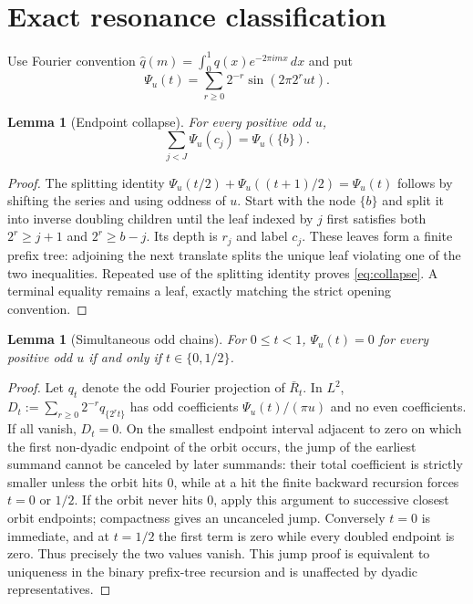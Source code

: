 \documentclass[11pt]{article}
\numberwithin{equation}{section}
\newtheorem{lemma}[theorem]{Lemma}
\theoremstyle{definition}\newtheorem{definition}[theorem]{Definition}
\theoremstyle{remark}\newtheorem{remark}[theorem]{Remark}
\newcommand{\1}{\mathbf 1}\newcommand{\cD}{\mathcal D}
\begin{document}
\clearpage
\section{Exact resonance classification}\label{sec:zeros}
Use Fourier convention $\widehat q(m)=\int_0^1q(x)e^{-2\pi imx}\,dx$ and put
\begin{equation}\Psi_u(t)=\sum_{r\ge0}2^{-r}\sin(2\pi2^ru t). \label{eq:Psi}
\end{equation}

\begin{lemma}[Endpoint collapse]\label{lem:collapse}
For every positive odd $u$,
\begin{equation}\sum_{j<J}\Psi_u(c_j)=\Psi_u(\{b\}).            \label{eq:collapse}
\end{equation}
\end{lemma}
\begin{proof}
The splitting identity
$\Psi_u(t/2)+\Psi_u((t+1)/2)=\Psi_u(t)$ follows by shifting the series and
using oddness of $u$.  Start with the node $\{b\}$ and split it into inverse
doubling children until the leaf indexed by $j$ first satisfies both
$2^r\ge j+1$ and $2^r\ge b-j$.  Its depth is $r_j$ and label $c_j$.
These leaves form a finite prefix tree: adjoining the next translate splits
the unique leaf violating one of the two inequalities.  Repeated use of the
splitting identity proves \eqref{eq:collapse}.  A terminal equality remains
a leaf, exactly matching the strict opening convention.
\end{proof}

\begin{lemma}[Simultaneous odd chains]\label{lem:oddchain}
For $0\le t<1$, $\Psi_u(t)=0$ for every positive odd $u$ if and only if
$t\in\{0,1/2\}$.
\end{lemma}
\begin{proof}
Let $q_t$ denote the odd Fourier projection of $\bar R_t$.  In $L^2$,
$D_t:=\sum_{r\ge0}2^{-r}q_{\{2^rt\}}$ has odd coefficients
$\Psi_u(t)/(\pi u)$ and no even coefficients.  If all vanish, $D_t=0$.
On the smallest endpoint interval adjacent to zero on which the first
non-dyadic endpoint of the orbit occurs, the jump of the earliest summand
cannot be canceled by later summands: their total coefficient is strictly
smaller unless the orbit hits $0$, while at a hit the finite backward
recursion forces $t=0$ or $1/2$.  If the orbit never hits $0$, apply this
argument to successive closest orbit endpoints; compactness gives an
uncanceled jump.  Conversely $t=0$ is immediate, and at $t=1/2$ the first
term is zero while every doubled endpoint is zero.  Thus precisely the two
values vanish.  This jump proof is equivalent to uniqueness in the binary
prefix-tree recursion and is unaffected by dyadic representatives.
\end{proof}
\end{document}
